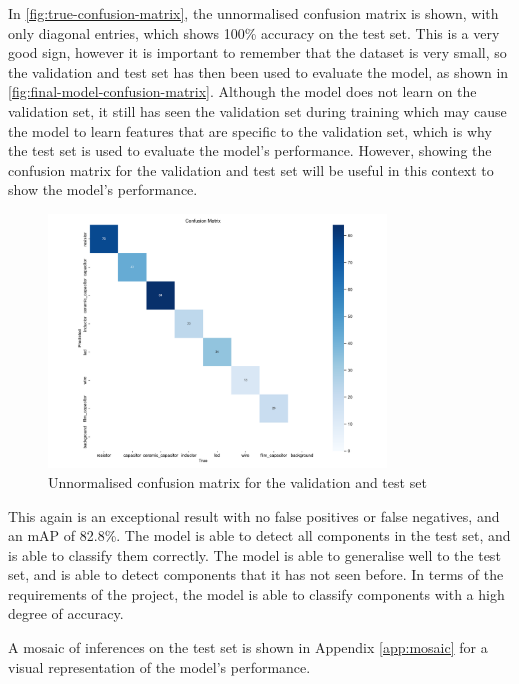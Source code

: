 In \autoref{fig:true-confusion-matrix}, the unnormalised confusion matrix is shown, with only diagonal entries, which shows 100\% accuracy on the test set. This is a very good sign, however it is important to remember that the dataset is very small, so the validation and test set has then been used to evaluate the model, as shown in \autoref{fig:final-model-confusion-matrix}. Although the model does not learn on the validation set, it still has seen the validation set during training which may cause the model to learn features that are specific to the validation set, which is why the test set is used to evaluate the model's performance. However, showing the confusion matrix for the validation and test set will be useful in this context to show the model's performance.

\begin{figure}[H]
  \centering
  \includegraphics[width=0.8\textwidth]{imgs/graphs/confusion_matrix_final_valtest.png}
  \caption{Unnormalised confusion matrix for the validation and test set}
  \label{fig:final-model-confusion-matrix}
\end{figure}

This again is an exceptional result with no false positives or false negatives, and an mAP of 82.8\%. The model is able to detect all components in the test set, and is able to classify them correctly. The model is able to generalise well to the test set, and is able to detect components that it has not seen before. In terms of the requirements of the project, the model is able to classify components with a high degree of accuracy.

A mosaic of inferences on the test set is shown in Appendix \autoref{app:mosaic} for a visual representation of the model's performance. 

